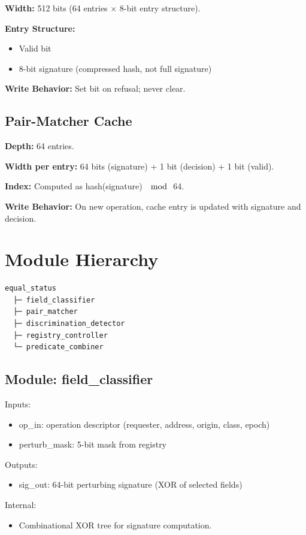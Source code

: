 \documentclass[11pt,oneside]{article}
\begin{document}
\textbf{Width:} 512 bits (64 entries × 8-bit entry structure).

\textbf{Entry Structure:}
\begin{itemize}
\item Valid bit
\item 8-bit signature (compressed hash, not full signature)
\end{itemize}

\textbf{Write Behavior:} Set bit on refusal; never clear.

\subsection{Pair-Matcher Cache}

\textbf{Depth:} 64 entries.

\textbf{Width per entry:} 64 bits (signature) + 1 bit (decision) + 1 bit (valid).

\textbf{Index:} Computed as hash(signature) $\mod$ 64.

\textbf{Write Behavior:} On new operation, cache entry is updated with signature and decision.

\section{Module Hierarchy}

\begin{lstlisting}
equal_status
  ├─ field_classifier
  ├─ pair_matcher
  ├─ discrimination_detector
  ├─ registry_controller
  └─ predicate_combiner
\end{lstlisting}

\subsection{Module: field\_classifier}

Inputs:
\begin{itemize}
\item op\_in: operation descriptor (requester, address, origin, class, epoch)
\item perturb\_mask: 5-bit mask from registry
\end{itemize}

Outputs:
\begin{itemize}
\item sig\_out: 64-bit perturbing signature (XOR of selected fields)
\end{itemize}

Internal:
\begin{itemize}
\item Combinational XOR tree for signature computation.
\end{itemize}
\end{document}
